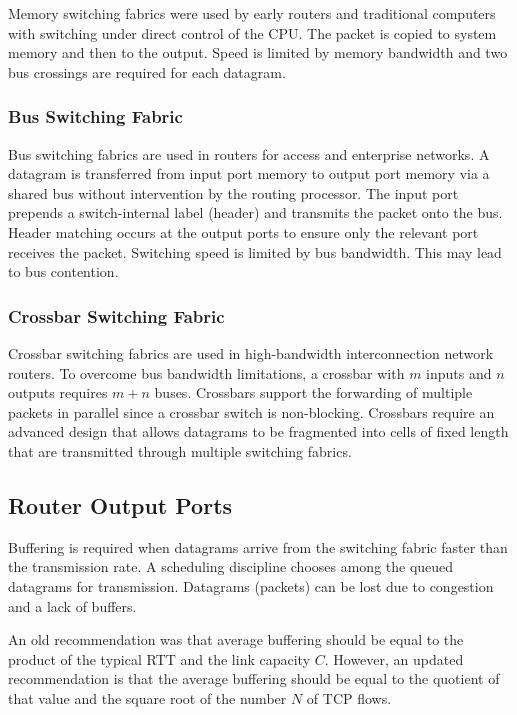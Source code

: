 Memory switching fabrics were used by early routers and traditional computers with switching under direct control of the CPU\@.
The packet is copied to system memory and then to the output.
Speed is limited by memory bandwidth and two bus crossings are required for each datagram.

\subsubsection{Bus Switching Fabric}

Bus switching fabrics are used in routers for access and enterprise networks.
A datagram is transferred from input port memory to output port memory via a shared bus without intervention by the routing processor.
The input port prepends a switch-internal label (header) and transmits the packet onto the bus.
Header matching occurs at the output ports to ensure only the relevant port receives the packet.
Switching speed is limited by bus bandwidth.
This may lead to bus contention.

\subsubsection{Crossbar Switching Fabric}

Crossbar switching fabrics are used in high-bandwidth interconnection network routers.
To overcome bus bandwidth limitations, a crossbar with \(m\) inputs and \(n\) outputs requires \(m + n\) buses.
Crossbars support the forwarding of multiple packets in parallel since a crossbar switch is non-blocking.
Crossbars require an advanced design that allows datagrams to be fragmented into cells of fixed length that are transmitted through multiple switching fabrics.

\subsection{Router Output Ports}

Buffering is required when datagrams arrive from the switching fabric faster than the transmission rate.
A scheduling discipline chooses among the queued datagrams for transmission.
Datagrams (packets) can be lost due to congestion and a lack of buffers.

An old recommendation was that average buffering should be equal to the product of the typical RTT and the link capacity \(C\).
However, an updated recommendation is that the average buffering should be equal to the quotient of that value and the square root of the number \(N\) of TCP flows.


